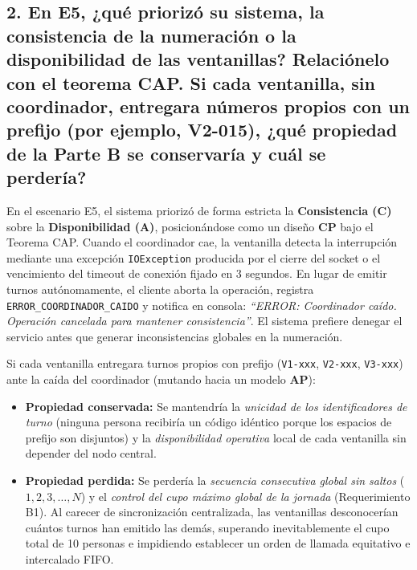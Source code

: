 \documentclass[10pt,a4paper]{article}
\begin{document}
\subsection*{2. En E5, ¿qué priorizó su sistema, la consistencia de la numeración o la disponibilidad de las ventanillas? Relaciónelo con el teorema CAP. Si cada ventanilla, sin coordinador, entregara números propios con un prefijo (por ejemplo, V2-015), ¿qué propiedad de la Parte B se conservaría y cuál se perdería?}
En el escenario E5, el sistema priorizó de forma estricta la \textbf{Consistencia (C)} sobre la \textbf{Disponibilidad (A)}, posicionándose como un diseño \textbf{CP} bajo el Teorema CAP. Cuando el coordinador cae, la ventanilla detecta la interrupción mediante una excepción \texttt{IOException} producida por el cierre del socket o el vencimiento del timeout de conexión fijado en 3 segundos. En lugar de emitir turnos autónomamente, el cliente aborta la operación, registra \texttt{ERROR\_COORDINADOR\_CAIDO} y notifica en consola: \textit{``ERROR: Coordinador caído. Operación cancelada para mantener consistencia''}. El sistema prefiere denegar el servicio antes que generar inconsistencias globales en la numeración.

Si cada ventanilla entregara turnos propios con prefijo (\texttt{V1-xxx}, \texttt{V2-xxx}, \texttt{V3-xxx}) ante la caída del coordinador (mutando hacia un modelo \textbf{AP}):
\begin{itemize}\setlength{\itemsep}{0pt}\setlength{\parskip}{0pt}
    \item \textbf{Propiedad conservada:} Se mantendría la \textit{unicidad de los identificadores de turno} (ninguna persona recibiría un código idéntico porque los espacios de prefijo son disjuntos) y la \textit{disponibilidad operativa} local de cada ventanilla sin depender del nodo central.
    \item \textbf{Propiedad perdida:} Se perdería la \textit{secuencia consecutiva global sin saltos} ($1, 2, 3, \dots, N$) y el \textit{control del cupo máximo global de la jornada} (Requerimiento B1). Al carecer de sincronización centralizada, las ventanillas desconocerían cuántos turnos han emitido las demás, superando inevitablemente el cupo total de 10 personas e impidiendo establecer un orden de llamada equitativo e intercalado FIFO.
\end{itemize}

\clearpage
\end{document}
